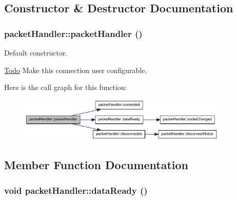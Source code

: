 \subsection{Constructor \& Destructor Documentation}
\hypertarget{classpacketHandler_a02936b9105618ed38701274efcfa0dfb}{
\subsubsection[{packetHandler}]{\setlength{\rightskip}{0pt plus 5cm}packetHandler::packetHandler ()}}
\label{classpacketHandler_a02936b9105618ed38701274efcfa0dfb}


Default constructor. 



\begin{Desc}
\item[\hyperlink{todo__todo000005}{Todo}]Make this connection user configurable. \end{Desc}




Here is the call graph for this function:\nopagebreak
\begin{figure}[H]
\begin{center}
\leavevmode
\includegraphics[width=283pt]{classpacketHandler_a02936b9105618ed38701274efcfa0dfb_cgraph}
\end{center}
\end{figure}




\subsection{Member Function Documentation}
\hypertarget{classpacketHandler_a9085a61a51eccc7acb240a7b68601686}{
\subsubsection[{dataReady}]{\setlength{\rightskip}{0pt plus 5cm}void packetHandler::dataReady ()}}
\label{classpacketHandler_a9085a61a51eccc7acb240a7b68601686}


